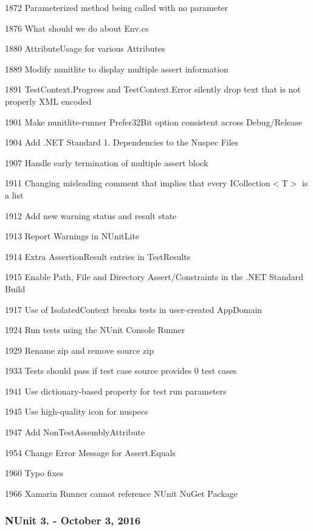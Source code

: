 \begin{DoxyItemize}
\item 1872 Parameterized method being called with no parameter
\item 1876 What should we do about Env.\+cs
\item 1880 Attribute\+Usage for various Attributes
\item 1889 Modify nunitlite to display multiple assert information
\item 1891 Test\+Context.\+Progress and Test\+Context.\+Error silently drop text that is not properly X\+ML encoded
\item 1901 Make nunitlite-\/runner Prefer32\+Bit option consistent across Debug/\+Release
\item 1904 Add .N\+ET Standard 1. Dependencies to the Nuspec Files
\item 1907 Handle early termination of multiple assert block
\item 1911 Changing misleading comment that implies that every {\ttfamily I\+Collection$<$T$>$} is a list
\item 1912 Add new warning status and result state
\item 1913 Report Warnings in N\+Unit\+Lite
\item 1914 Extra Assertion\+Result entries in Test\+Results
\item 1915 Enable Path, File and Directory Assert/\+Constraints in the .N\+ET Standard Build
\item 1917 Use of Isolated\+Context breaks tests in user-\/created App\+Domain
\item 1924 Run tests using the N\+Unit Console Runner
\item 1929 Rename zip and remove source zip
\item 1933 Tests should pass if test case source provides 0 test cases
\item 1941 Use dictionary-\/based property for test run parameters
\item 1945 Use high-\/quality icon for nuspecs
\item 1947 Add Non\+Test\+Assembly\+Attribute
\item 1954 Change Error Message for Assert.\+Equals
\item 1960 Typo fixes
\item 1966 Xamarin Runner cannot reference N\+Unit Nu\+Get Package
\end{DoxyItemize}

\subsubsection*{N\+Unit 3. -\/ October 3, 2016}

